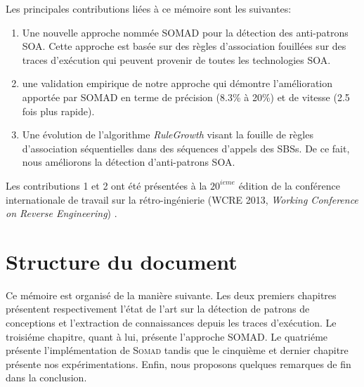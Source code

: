 \begin{introduction}
Les principales contributions li\'ees \`a ce m\'emoire sont les suivantes:

\begin{enumerate}
\item Une nouvelle approche nomm\'ee SOMAD pour la d\'etection des anti-patrons SOA.
Cette approche est bas\'ee sur des r\`egles d'association fouill\'ees sur des traces d'ex\'ecution qui peuvent provenir de toutes les technologies SOA.
\item une validation empirique de notre approche qui d\'emontre l'am\'elioration apport\'ee par SOMAD en terme de pr\'ecision (8.3\% \`a 20\%) et de vitesse (2.5 fois plus rapide).
\item Une \'evolution de l'algorithme \textit{RuleGrowth} visant la fouille de r\`egles d'association s\'equentielles dans des s\'equences d'appels des SBSs.
De ce fait, nous am\'eliorons la d\'etection d'anti-patrons SOA.
\end{enumerate}

Les contributions 1 et 2 ont \'et\'e pr\'esent\'ees \`a la $20^{ieme}$ \'edition de la conf\'erence internationale de travail sur la r\'etro-ing\'enierie (WCRE 2013, \textit{Working Conference on Reverse Engineering}) \citep{Nayrolles2013a}.

\section*{Structure du document}

Ce m\'emoire est organis\'e de la mani\`ere suivante. Les deux premiers chapitres pr\'esentent respectivement l'\'etat de l'art sur la d\'etection de patrons de conceptions et l'extraction de connaissances depuis les traces d'ex\'ecution.
Le troisi\'eme chapitre, quant \`a lui, pr\'esente l'approche SOMAD.
Le quatri\'eme pr\'esente l'impl\'ementation de \textsc{Somad} tandis que le cinqui\`eme et dernier chapitre pr\'esente nos exp\'erimentations. Enfin, nous proposons quelques remarques de fin dans la conclusion.

\end{introduction}